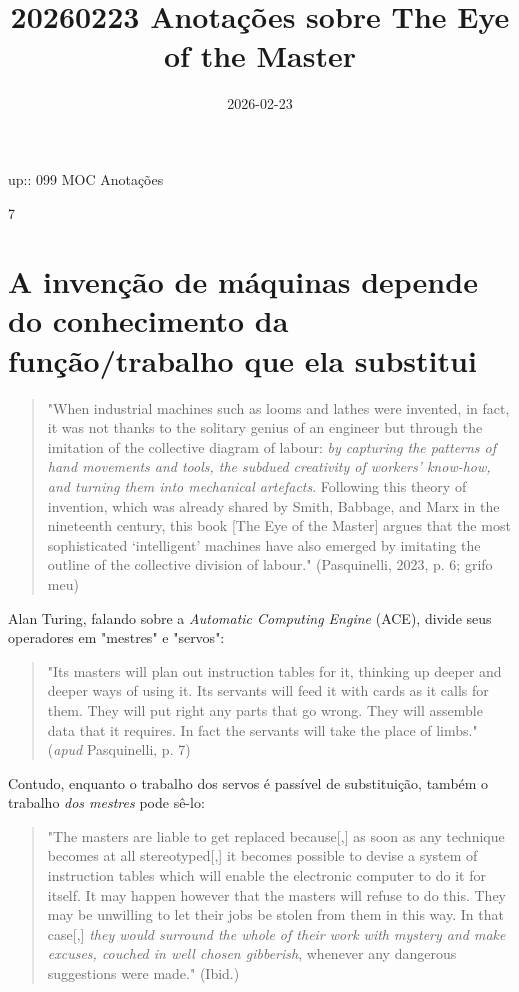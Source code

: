 \documentclass[
]{article}
\title{20260223 Anotações sobre The Eye of the Master}
\author{}
\date{2026-02-23}
\begin{document}
\maketitle

up:: 099 MOC Anotações

7

\section{A invenção de máquinas depende do conhecimento da
função/trabalho que ela
substitui}\label{a-invenuxe7uxe3o-de-muxe1quinas-depende-do-conhecimento-da-funuxe7uxe3otrabalho-que-ela-substitui}

\begin{quote}
"When industrial machines such as looms and lathes were invented, in
fact, it was not thanks to the solitary genius of an engineer but
through the imitation of the collective diagram of labour: \emph{by
capturing the patterns of hand movements and tools, the subdued
creativity of workers' know-how, and turning them into mechanical
artefacts}. Following this theory of invention, which was already shared
by Smith, Babbage, and Marx in the nineteenth century, this book {[}The
Eye of the Master{]} argues that the most sophisticated `intelligent'
machines have also emerged by imitating the outline of the collective
division of labour." (Pasquinelli, 2023, p. 6; grifo meu)
\end{quote}

Alan Turing, falando sobre a \emph{Automatic Computing Engine} (ACE),
divide seus operadores em "mestres" e "servos":

\begin{quote}
"Its masters will plan out instruction tables for it, thinking up deeper
and deeper ways of using it. Its servants will feed it with cards as it
calls for them. They will put right any parts that go wrong. They will
assemble data that it requires. In fact the servants will take the place
of limbs." (\emph{apud} Pasquinelli, p. 7)
\end{quote}

Contudo, enquanto o trabalho dos servos é passível de substituição,
também o trabalho \emph{dos mestres} pode sê-lo:

\begin{quote}
"The masters are liable to get replaced because{[},{]} as soon as any
technique becomes at all stereotyped{[},{]} it becomes possible to
devise a system of instruction tables which will enable the electronic
computer to do it for itself. It may happen however that the masters
will refuse to do this. They may be unwilling to let their jobs be
stolen from them in this way. In that case{[},{]} \emph{they would
surround the whole of their work with mystery and make excuses, couched
in well chosen gibberish}, whenever any dangerous suggestions were
made." (Ibid.)
\end{quote}
\end{document}

